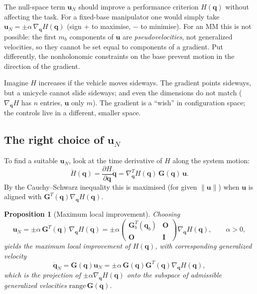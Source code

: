 \documentclass[11pt,a4paper]{article}
\newcommand{\qbase}{\bm{q}_b}
\newcommand{\Gbase}{\bm{G}_b}
\newcommand{\grad}{\nabla_{\!\bm{q}}}
\theoremstyle{plain}
\newtheorem{proposition}[theorem]{Proposition}
\theoremstyle{definition}
\theoremstyle{remark}
\begin{document}
The null-space term $\bm u_N$ should improve a performance criterion $H(\bm q)$ without affecting the task. For a fixed-base manipulator one would simply take $\bm u_N=\pm\alpha\,\grad H(\bm q)$ (sign $+$ to maximise, $-$ to minimise). For an MM this is not possible: the first $m_b$ components of $\bm u$ are \emph{pseudovelocities}, not generalized velocities, so they cannot be set equal to components of a gradient. Put differently, the nonholonomic constraints on the base prevent motion in the direction of the gradient.

\begin{intuition}
Imagine $H$ increases if the vehicle moves sideways. The gradient points sideways, but a unicycle cannot slide sideways; and even the dimensions do not match ($\grad H$ has $n$ entries, $\bm u$ only $m$). The gradient is a ``wish'' in configuration space; the controls live in a different, smaller space.
\end{intuition}

\subsection{The right choice of \texorpdfstring{$\bm u_N$}{uN}}

To find a suitable $\bm u_N$, look at the time derivative of $H$ along the system motion:
\[
\dot H(\bm q)=\frac{\partial H}{\partial\bm q}\dot{\bm q}=\grad^{\!T}H(\bm q)\,\bm G(\bm q)\,\bm u .
\]
By the Cauchy--Schwarz inequality this is maximised (for given $\|\bm u\|$) when $\bm u$ is aligned with $\bm G^T(\bm q)\grad H(\bm q)$.

\begin{proposition}[Maximum local improvement]\label{prop:uN}
Choosing
\[
\bm u_N=\pm\alpha\,\bm G^T(\bm q)\,\grad H(\bm q)=\pm\alpha\begin{pmatrix}\Gbase^T(\qbase)&\bm O\\ \bm O&\bm I\end{pmatrix}\grad H(\bm q),\qquad\alpha>0,
\]
yields the maximum local improvement of $H(\bm q)$, with corresponding generalized velocity
\[
\dot{\bm q}_N=\bm G(\bm q)\bm u_N=\pm\alpha\,\bm G(\bm q)\bm G^T(\bm q)\grad H(\bm q),
\]
which is the projection of $\pm\alpha\grad H(\bm q)$ onto the subspace of admissible generalized velocities $\mathrm{range}\,\bm G(\bm q)$.
\end{proposition}
\end{document}
